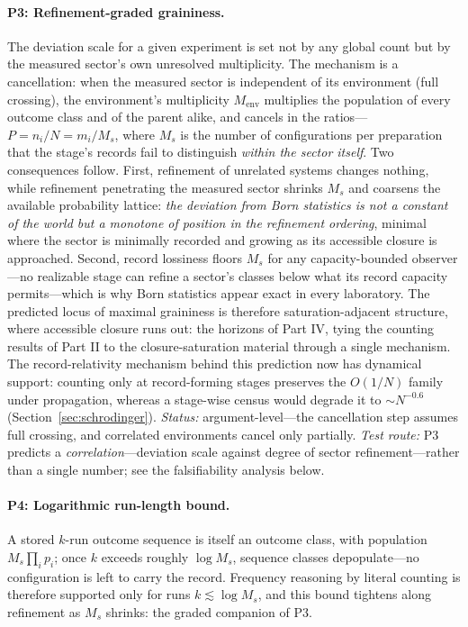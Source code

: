 \documentclass[11pt]{article}
\theoremstyle{definition}
\theoremstyle{remark}
\begin{document}
\paragraph{P3: Refinement-graded graininess.} The deviation scale for a given experiment is set not by any global count but by the measured sector's own unresolved multiplicity. The mechanism is a cancellation: when the measured sector is independent of its environment (full crossing), the environment's multiplicity $M_{\mathrm{env}}$ multiplies the population of every outcome class and of the parent alike, and cancels in the ratios---$P = n_i/N = m_i/M_s$, where $M_s$ is the number of configurations per preparation that the stage's records fail to distinguish \emph{within the sector itself}. Two consequences follow. First, refinement of unrelated systems changes nothing, while refinement penetrating the measured sector shrinks $M_s$ and coarsens the available probability lattice: \emph{the deviation from Born statistics is not a constant of the world but a monotone of position in the refinement ordering}, minimal where the sector is minimally recorded and growing as its accessible closure is approached. Second, record lossiness floors $M_s$ for any capacity-bounded observer---no realizable stage can refine a sector's classes below what its record capacity permits---which is why Born statistics appear exact in every laboratory. The predicted locus of maximal graininess is therefore saturation-adjacent structure, where accessible closure runs out: the horizons of Part IV, tying the counting results of Part II to the closure-saturation material through a single mechanism. The record-relativity mechanism behind this prediction now has dynamical support: counting only at record-forming stages preserves the $O(1/N)$ family under propagation, whereas a stage-wise census would degrade it to $\sim N^{-0.6}$ (Section~\ref{sec:schrodinger}). \emph{Status:} argument-level---the cancellation step assumes full crossing, and correlated environments cancel only partially. \emph{Test route:} P3 predicts a \emph{correlation}---deviation scale against degree of sector refinement---rather than a single number; see the falsifiability analysis below.

\paragraph{P4: Logarithmic run-length bound.} A stored $k$-run outcome sequence is itself an outcome class, with population $M_s \prod_i p_i$; once $k$ exceeds roughly $\log M_s$, sequence classes depopulate---no configuration is left to carry the record. Frequency reasoning by literal counting is therefore supported only for runs $k \lesssim \log M_s$, and this bound tightens along refinement as $M_s$ shrinks: the graded companion of P3.
\end{document}
